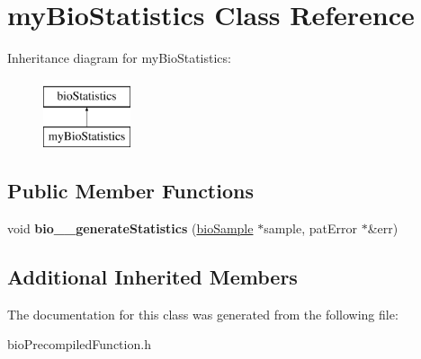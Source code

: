 \hypertarget{classmy_bio_statistics}{}\section{my\+Bio\+Statistics Class Reference}
\label{classmy_bio_statistics}
Inheritance diagram for my\+Bio\+Statistics\+:\begin{figure}[H]
\begin{center}
\leavevmode
\includegraphics[height=2.000000cm]{classmy_bio_statistics}
\end{center}
\end{figure}
\subsection*{Public Member Functions}
\begin{DoxyCompactItemize}
\item 
\mbox{\label{classmy_bio_statistics_aaeb14dc0f0e5ead81c74d91691742b28}} 
void {\bfseries bio\+\_\+\+\_\+generate\+Statistics} (\hyperlink{classbio_sample}{bio\+Sample} $\ast$sample, pat\+Error $\ast$\&err)
\end{DoxyCompactItemize}
\subsection*{Additional Inherited Members}


The documentation for this class was generated from the following file\+:\begin{DoxyCompactItemize}
\item 
bio\+Precompiled\+Function.\+h\end{DoxyCompactItemize}
